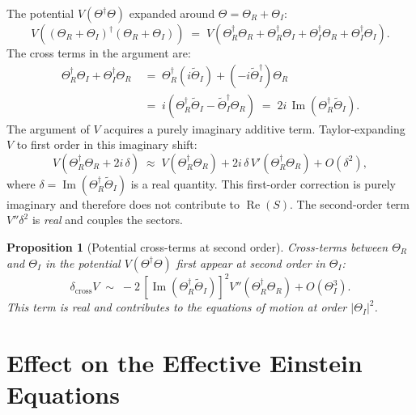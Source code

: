 \documentclass[12pt]{article}
\newtheorem{proposition}{Proposition}
\begin{document}
The potential $V(\Theta^\dagger\Theta)$ expanded around
$\Theta = \Theta_R + \Theta_I$:
\begin{equation}
  V((\Theta_R+\Theta_I)^\dagger(\Theta_R+\Theta_I))
  \;=\; V(\Theta_R^\dagger\Theta_R
         + \Theta_R^\dagger\Theta_I
         + \Theta_I^\dagger\Theta_R
         + \Theta_I^\dagger\Theta_I).
\end{equation}
The cross terms in the argument are:
\begin{align}
  \Theta_R^\dagger\Theta_I + \Theta_I^\dagger\Theta_R
  &\;=\; \Theta_R^\dagger(i\widetilde\Theta_I)
        + (-i\widetilde\Theta_I^\dagger)\Theta_R \nonumber\\
  &\;=\; i(\Theta_R^\dagger\widetilde\Theta_I
          - \widetilde\Theta_I^\dagger\Theta_R)
  \;=\; 2i\,\operatorname{Im}(\Theta_R^\dagger\widetilde\Theta_I).
  \label{eq:pot_cross_arg}
\end{align}
The argument of $V$ acquires a purely imaginary additive term.
Taylor-expanding $V$ to first order in this imaginary shift:
\begin{equation}
  V(\Theta_R^\dagger\Theta_R + 2i\,\delta)
  \;\approx\; V(\Theta_R^\dagger\Theta_R)
             + 2i\,\delta\,V'(\Theta_R^\dagger\Theta_R)
             + O(\delta^2),
\end{equation}
where $\delta = \operatorname{Im}(\Theta_R^\dagger\widetilde\Theta_I)$
is a real quantity.  This first-order correction is purely imaginary
and therefore does not contribute to $\operatorname{Re}(S)$.
The second-order term $V'' \delta^2$ is \emph{real} and couples
the sectors.

\begin{proposition}[Potential cross-terms at second order]
\label{prop:pot_cross}
Cross-terms between $\Theta_R$ and $\Theta_I$ in the potential
$V(\Theta^\dagger\Theta)$ first appear at second order in $\Theta_I$:
\begin{equation}
  \delta_\mathrm{cross}V
  \;\sim\; -2\,\left[
    \operatorname{Im}(\Theta_R^\dagger\widetilde\Theta_I)
  \right]^2 V''(\Theta_R^\dagger\Theta_R)
  + O(\Theta_I^3).
\end{equation}
This term is real and contributes to the equations of motion at
order $|\Theta_I|^2$.
\end{proposition}

\section{Effect on the Effective Einstein Equations}
\end{document}
